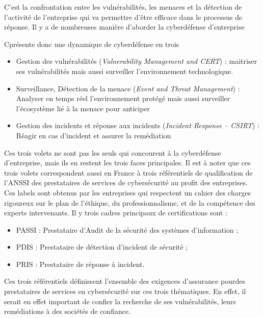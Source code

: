 C’est la confrontation entre les vulnérabilités, les menaces et la détection de l’activité de l’entreprise qui va permettre d’être efficace dans  le processus de réponse. Il y a de nombreuses manière d’aborder la cyberdéfense d’entreprise

C\edoc présente donc une dynamique de cyberdéfense en trois

\begin{itemize}
\item Gestion des vulnérabilités (\textit{Vulnerability Management and CERT}) : maitriser ses vulnérabilités mais aussi surveiller l’environnement technologique. 
\item Surveillance, Détection de la menace (\textit{Event and Threat Management}) :  Analyser en temps réel l’environnement protégé mais aussi surveiller l’écosystème lié à la menace pour anticiper 
\item Gestion des incidents et réponse aux incidents (\textit{Incident Response – CSIRT}) : Réagir en cas d’incident et assurer la remédiation
\end{itemize}


Ces trois volets ne sont pas les seuls qui concourent à la cyberdéfense d’entreprise, mais ils en restent les trois faces principales. Il est à noter que ces trois volets correspondent aussi en France à trois référentiels de qualification de l’ANSSI des prestataires de services de cybersécurité au profit des entreprises. Ces labels sont obtenus par les entreprises qui respectent un cahier des charges rigoureux sur le plan de l'éthique, du professionnalisme, et de la compétence des experts intervenants. Il y trois cadres principaux de certifications sont :

\begin{itemize}
\item PASSI : Prestataire d’Audit de la sécurité des systèmes d’information ;
\item PDIS : Prestataire de détection d’incident de sécurité ;
\item PRIS : Prestataire de réponse à incident.
\end{itemize}

Ces trois référentiels définissent l’ensemble des exigences d’assurance pourdes prestataires de services en cybersécurité sur ces trois thématiques. En effet, il serait  en effet important de confier la recherche de ses vulnérabilités, leurs remédiations à des sociétés  de confiance. 

